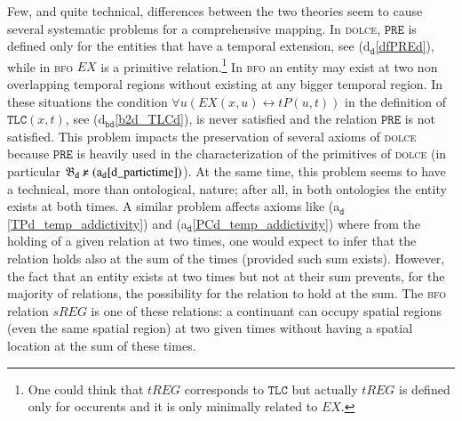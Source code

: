 \documentclass[ao]{iosart2x}
\newcommand{\nb}[1]{\textcolor{red}{$|$}\marginpar{\hspace*{-0cm}\parbox{20mm}{\scriptsize\raggedright\textcolor{red}{#1}}}}
\newcommand{\dolceAxLabel}{\textrm{a$_\texttt{d}$}}
\newcommand{\dolceDefLabel}{\textrm{d$_\texttt{d}$}}
\newcommand{\bdDefLabel}{\textrm{d$_\texttt{bd}$}}
\newcommand{\bdThrLabel}{\textrm{t$_\texttt{bd}$}}
\newcommand{\refdolceax}[1]{({\dolceAxLabel}\ref{#1})}
\newcommand{\refdolcedf}[1]{({\dolceDefLabel}\ref{#1})}
\newcommand{\refbddf}[1]{({\bdDefLabel}\ref{#1})}
\newcommand{\refbdth}[1]{({\bdThrLabel}\ref{#1})}
\newcommand{\pr}[1]{\mathtt{#1}}
\newcommand{\prbfo}[1]{{\textit{{#1}}}}
\newcommand{\ifif}{\leftrightarrow}
\newcommand{\dolce}{{\textsc{dolce}}}
\newcommand{\bfo}{{\textsc{bfo}}}
\newcommand {\thbfobdmap} {\ensuremath{\mathfrak{B}_\texttt{d}}}
\newcommand {\PREd} {\ensuremath{\pr{PRE}}}
\newcommand {\TLCd} {\ensuremath{\pr{TLC}}}
\newcommand{\bfotpart}{\prbfo{tP}}
\newcommand{\bfoexist}{\prbfo{EX}}
\newcommand{\bfosregof}{\prbfo{sREG}}
\newcommand{\bfotregof}{\prbfo{tREG}}
\begin{document}
Few, and quite technical, differences between the two theories seem to cause several systematic problems for a comprehensive mapping. In {\dolce}, $\PREd$ is defined only for the entities that have a temporal extension, see \refdolcedf{dfPREd}, while in {\bfo} $\bfoexist$ is a primitive relation.\footnote{One could think that $\bfotregof$ corresponds to $\TLCd$ but actually $\bfotregof$ is defined only for occurents and it is only minimally related to $\bfoexist$.} %
In {\bfo} an entity may exist at two non overlapping temporal regions without existing at any bigger temporal region. In these situations the condition $\forall u(\bfoexist(x,u) \ifif \bfotpart(u,t))$ in the definition of $\TLCd(x,t)$, see \refbddf{b2d_TLCd}, is never satisfied and the relation $\PREd$ is not satisfied. This problem impacts the preservation of several axioms of {\dolce}  %
because $\PREd$ is heavily used in the characterization of the primitives of {\dolce} (in particular ${\thbfobdmap \nvDash \refdolceax{d_partictime}}$). At the same time, this problem seems to have a technical, more than ontological, nature; after all, in both ontologies the entity exists at both times. A similar problem affects axioms like  \refdolceax{TPd_temp_addictivity} and \refdolceax{PCd_temp_addictivity} where from the holding of a given relation at two times, one would expect to infer that the relation holds also at the sum of the times (provided such sum exists). 
However, the fact that an entity exists at two times but not at their sum prevents, for the majority of relations, the possibility for the relation to hold at the sum.%
%
%
The {\bfo} relation $\bfosregof$ is one of these relations: a continuant can occupy spatial regions (even the same spatial region) at two given times without having a spatial location at the sum of these times. %
\end{document}
